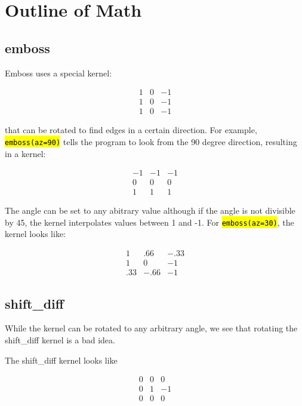 \documentclass[10pt]{article}
\begin{document}

\section{Outline of Math}
    \subsection{emboss} %
    \label{sub:emboss}
    Emboss uses a special kernel:

    \[ \begin{array}{ccc}
    1 &  0 & -1 \\
    1 &  0 & -1 \\
    1 &  0 & -1 \end{array}\] 

     that can be rotated to find edges in a certain direction. For example, \hl{\texttt{emboss(az=90)}} tells the program to look from the 90 degree direction, resulting in a kernel:

     \[ \begin{array}{ccc}
    -1 & -1 & -1 \\
     0 &  0 &  0 \\
     1 &  1 &  1 \end{array}\] 

     The angle can be set to any abitrary value although if the angle is not divisible by 45, the kernel interpolates values between 1 and -1. For \hl{\texttt{emboss(az=30)}}, the kernel looks like:

     \[ \begin{array}{ccc}
    1   & .66   & -.33 \\
    1   &  0    & -1 \\
     .33&  -.66 & -1 \end{array}\] 

    \subsection{shift\_diff} %
    \label{sub:shift_diff}

    While the kernel can be rotated to any arbitrary angle, we see that rotating the shift\_diff kernel is a bad idea. 

    The shift\_diff kernel looks like

    \[ \begin{array}{ccc}
    0   & 0  & 0 \\
    0   &  1 & -1 \\
    0   &  0 & 0 \end{array}\] 
\end{document}
